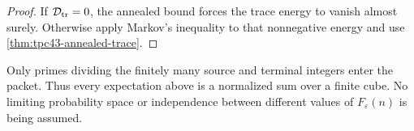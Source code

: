 \begin{proof}
If \(\mathcal D_{\rm tr}=0\), the annealed bound forces the trace energy to
vanish almost surely.  Otherwise apply Markov's inequality to that
nonnegative energy and use
\cref{thm:tpc43-annealed-trace}.
\end{proof}

\begin{remark}
\label{rem:tpc43-finite-ensemble}
Only primes dividing the finitely many source and terminal integers enter
the packet.  Thus every expectation above is a normalized sum over a
finite cube.  No limiting probability space or independence between
different values of \(F_\varepsilon(n)\) is being assumed.
\end{remark}
